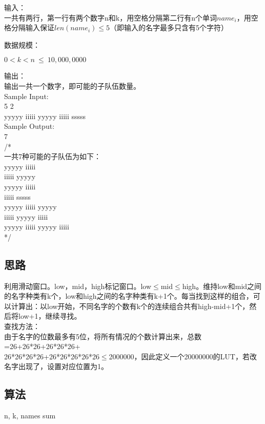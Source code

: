 \documentclass[UTF8]{ctexart}
\begin{document}
输入：\\
一共有两行，第一行有两个数字n和k，用空格分隔第二行有n个单词$name_i$​，用空格分隔输入保证$len(name_i)\leq5$（即输入的名字最多只含有5个字符）

数据规模：

$0<k<n\ \leq\ 10,000,0000$

输出：\\
输出一共一个数字，即可能的子队伍数量。\\

Sample Input:\\
5 2\\
yyyyy iiiii yyyyy iiiii sssss\\

Sample Output:\\
7\\
/*\\
一共7种可能的子队伍为如下：\\
yyyyy iiiii\\
iiiii yyyyy\\
yyyyy iiiii\\
iiiii sssss\\
yyyyy iiiii yyyyy\\
iiiii yyyyy iiiii\\
yyyyy iiiii yyyyy iiiii\\
*/\\

\subsection{思路}
利用滑动窗口。low，mid，high标记窗口。low$\leq$mid$\leq$high。维持low和mid之间的名字种类有k个，low和high之间的名字种类有k+1个。每当找到这样的组合，可以计算出：以low开始，不同名字的个数有k个的连续组合共有high-mid+1个，然后将low+1，继续寻找。\\
查找方法：\\
由于名字的位数最多有5位，将所有情况的个数计算出来，总数=26+26*26+26*26*26+\\26*26*26*26+26*26*26*26*26$\leq$2000000，因此定义一个20000000的LUT，若改名字出现了，设置对应位置为1。

\subsection{算法}

\renewcommand{\algorithmicrequire}{\textbf{输入:}}
\renewcommand{\algorithmicensure}{\textbf{输出:}}
\begin{algorithm}
	\caption{}
	\begin{algorithmic}[1]
	\Require n, k, names
	\Ensure sum
		\EndWhile
	\EndIf
	\EndWhile
	\EndFor
	\end{algorithmic}
\end{algorithm}
\end{document}
